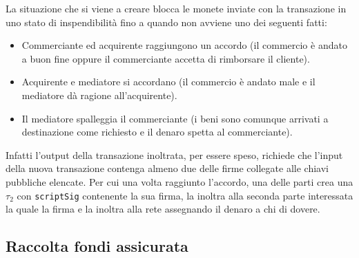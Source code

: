 La situazione che si viene a creare blocca le monete inviate con la transazione in uno stato di inspendibilità fino a quando non avviene uno dei seguenti fatti:
\begin{itemize}
    \item Commerciante ed acquirente raggiungono un accordo (il commercio è andato a buon fine oppure il commerciante accetta di rimborsare il cliente).
    \item Acquirente e mediatore si accordano (il commercio è andato male e il mediatore dà ragione all'acquirente).
    \item Il mediatore spalleggia il commerciante (i beni sono comunque arrivati a destinazione come richiesto e il denaro spetta al commerciante).
\end{itemize}
Infatti l'output della transazione inoltrata, per essere speso, richiede che l'input della nuova transazione contenga almeno due delle firme collegate alle chiavi pubbliche elencate. Per cui una volta raggiunto l'accordo, una delle parti crea una $\tau_2$ con \verb|scriptSig| contenente la sua firma, la inoltra alla seconda parte interessata la quale la firma e la inoltra alla rete assegnando il denaro a chi di dovere.

\subsection{Raccolta fondi assicurata}

